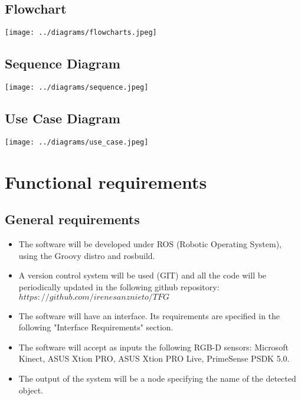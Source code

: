 \documentclass{article}
\begin{document}
\subsection{Flowchart}
\begin{center}
\texttt{[image: ../diagrams/flowcharts.jpeg]}
\end{center}

\subsection{Sequence Diagram}
\begin{center}
\texttt{[image: ../diagrams/sequence.jpeg]}
\end{center}

\subsection{Use Case Diagram}
\begin{center}
\texttt{[image: ../diagrams/use\_case.jpeg]}
\end{center}



\section{Functional requirements}

\subsection{General requirements}
\begin{itemize}

	\item The software will be developed under ROS (Robotic Operating System), using the Groovy distro and rosbuild.
	\item A version control system will be used (GIT) and all the code will be periodically updated in the following github repository:  $https://github.com/irenesanznieto/TFG$
	\item The software will have an interface. Its requirements are specified in the following "Interface Requirements" section. 
	\item The software will accept as inputs the following RGB-D sensors: Microsoft Kinect, ASUS Xtion PRO, ASUS Xtion PRO Live, PrimeSense PSDK 5.0.
	\item The output of the system will be a node specifying the name of the detected object. 
 
\end{itemize}
 
\end{document}
